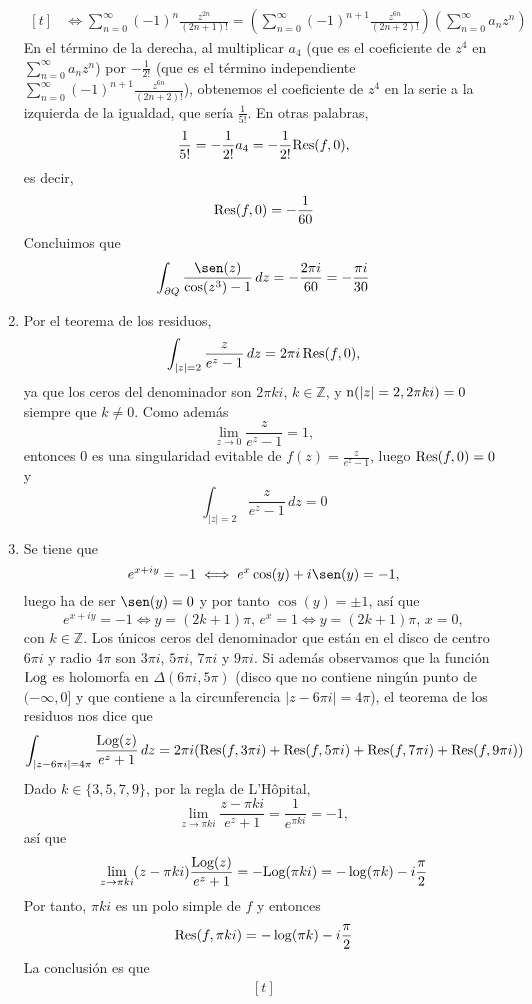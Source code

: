 \documentclass[11pt]{report}
\makeatletter
\renewenvironment{proof}[1][\proofname]{\par
  \pushQED{\qed}%
  \normalfont \topsep\z@skip %
  \trivlist
  \item[\hskip\labelsep
        \itshape
    #1\@addpunct{.}]\ignorespaces
}{%
  \popQED\endtrivlist\@endpefalse
}
\newcommand{\Z}{\mathbb Z}
\makeatother
\begin{document}
\begin{proof}
\begin{enumerate}
\[\begin{aligned}[t]
      &\iff \sum_{n=0}^\infty (-1)^n\frac{z^{2n}}{(2n+1)!} =\left(\sum_{n=0}^\infty(-1)^{n+1} \frac{z^{6n}}{(2n+2)!}\right)\left(\sum_{n=0}^\infty a_nz^n\right)
    \end{aligned}\]
    En el término de la derecha, al multiplicar $a_4$ (que es el coeficiente de $z^4$ en $\sum_{n=0}^\infty a_nz^n$) por $-\frac{1}{2!}$ (que es el término independiente $\sum_{n=0}^\infty(-1)^{n+1} \frac{z^{6n}}{(2n+2)!}$), obtenemos el coeficiente de $z^4$ en la serie a la izquierda de la igualdad, que sería $\frac{1}{5!}$. En otras palabras,
    \[\frac{1}{5!} = -\frac{1}{2!}a_4 = -\frac{1}{2!}\textup{Res}(f,0),\]
    es decir,
    \[\textup{Res}(f,0) = -\frac{1}{60}\]
    Concluimos que
    \[\int_{\partial Q}\frac{\sen(z)}{\cos(z^3)-1} \, dz = -\frac{2\pi i}{60} = -\frac{\pi i}{30}\]
    \item Por el teorema de los residuos,
    \[\int_{|z|=2} \frac{z}{e^z-1} \, dz = 2\pi i \, \textup{Res}(f,0),\]
    ya que los ceros del denominador son $2\pi ki$, $k \in \Z$, y $\textup{n}(|z|=2,2\pi k i) = 0$ siempre que $k \neq 0$. Como además
    \[\lim_{z \to 0} \frac{z}{e^z-1} = 1,\]
    entonces $0$ es una singularidad evitable de $f(z)=\frac{z}{e^z-1}$, luego $\textup{Res}(f,0) = 0$ y
    \[\int_{|z|=2} \frac{z}{e^z-1} \, dz =0\]
    \item Se tiene que
    \[e^{x+iy} = -1 \iff e^x\cos(y)+i\sen(y)=-1,\]
    luego ha de ser $\sen(y)=0$ y por tanto $\cos(y)=\pm 1$, así que
    \[e^{x+iy} = -1 \iff y = (2k+1)\pi, \, e^x = 1 \iff y=(2k+1)\pi, \, x  =0,\]
    con $k \in \Z$. Los únicos ceros del denominador que están en el disco de centro $6\pi i$ y radio $4\pi$ son $3\pi i$, $5\pi i$, $7\pi i$ y $9\pi i$. Si además observamos que la función $\textup{Log}$ es holomorfa en $\Delta(6\pi i, 5\pi)$ (disco que no contiene ningún punto de $(-\infty,0]$ y que contiene a la circunferencia $|z-6\pi i|=4\pi$), el teorema de los residuos nos dice que
    \[\int_{|z-6\pi i| = 4\pi} \frac{\textup{Log}(z)}{e^z+1} \, dz = 2\pi i(\textup{Res}(f,3\pi i) + \textup{Res}(f,5\pi i) + \textup{Res}(f,7\pi i) + \textup{Res}(f,9\pi i))\]
    Dado $k \in \{3,5,7,9\}$, por la regla de L'Hôpital,
    \[\lim_{z \to \pi k i} \frac{z-\pi k i }{e^z+1} =\frac{1}{e^{\pi k i}} = -1, \]
    así que
    \[\lim_{z \to \pi k i} (z-\pi k i)\frac{\textup{Log}(z)}{e^z+1} = -\textup{Log}(\pi k i) = -\log(\pi k)-i\frac{\pi}{2}\]
    Por tanto, $\pi k i$ es un polo simple de $f$ y entonces
    \[\textup{Res}(f,\pi k i) = -\log(\pi k)-i\frac{\pi}{2}\]
    La conclusión es que
    \[
    \begin{aligned}[t]

\end{aligned}\]
\end{enumerate}
\end{proof}
\end{document}
